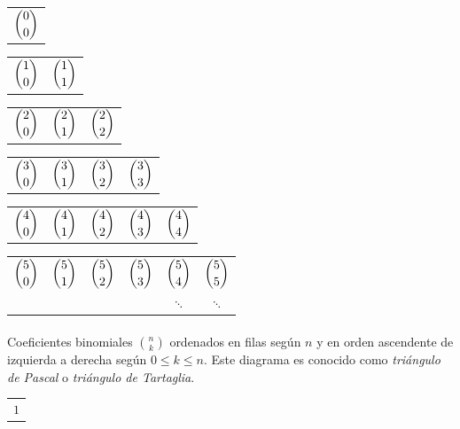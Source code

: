 \documentclass{article}
\theoremstyle{definition}
\begin{document}
\begin{multicols}{2}


\begin{center}
\begin{tabular}
{c}
$\displaystyle \binom{0}{0}$\\
\end{tabular}

\begin{tabular}
{c c}
$\displaystyle \binom{1}{0}$ & $\displaystyle \binom{1}{1}$\\
\end{tabular}

\begin{tabular}
{c c c}
$\displaystyle \binom{2}{0}$ & $\displaystyle \binom{2}{1}$ & $\displaystyle \binom{2}{2}$\\
\end{tabular}

\begin{tabular}
{c c c c}
$\displaystyle \binom{3}{0}$ & $\displaystyle \binom{3}{1}$ & $\displaystyle \binom{3}{2}$ & $\displaystyle \binom{3}{3}$\\
\end{tabular}

\begin{tabular}
{c c c c c}
$\displaystyle \binom{4}{0}$ & $\displaystyle \binom{4}{1}$ & $\displaystyle \binom{4}{2}$ & $\displaystyle \binom{4}{3}$ & $\displaystyle \binom{4}{4}$\\
\end{tabular}

\begin{tabular}
{c c c c c c}
$\displaystyle \binom{5}{0}$ & $\displaystyle \binom{5}{1}$ & $\displaystyle \binom{5}{2}$ & $\displaystyle \binom{5}{3}$ & $\displaystyle \binom{5}{4}$ & $\displaystyle \binom{5}{5}$\\ 
{$\ddots$} & {$\ddots$} &  &  & $\ddots$ & $\ddots$\\ 
\end{tabular} 


\paragraph{}
Coeficientes binomiales $\binom{n}{k}$ ordenados en filas según $n$ y en orden ascendente de izquierda a derecha según $0 \leq k \leq n$. Este diagrama es conocido como \textsl{triángulo de Pascal} o \textsl{triángulo de Tartaglia}.

\end{center}
 \vfill\null
\columnbreak

\begin{center}
\begin{tabular}
{c}
$1$\\
\end{tabular}


\end{center}
\end{multicols}
\end{document}
